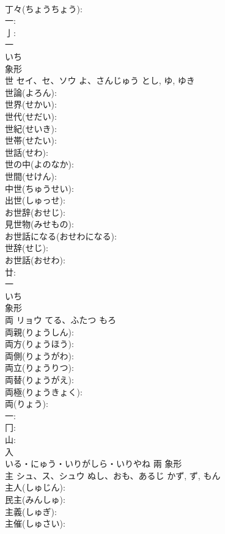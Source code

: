 \documentclass[8pt]{extreport}
\begin{document}
\begin{CJK}{UTF8}{min}
\\	丁々(ちょうちょう): 
\\	一: 
\\	亅: 
\\	一	
\\	いち	
\\	象形 
\\	世	セイ、セ、ソウ	よ、さんじゅう	とし, ゆ, ゆき	
\\	世論(よろん): 
\\	世界(せかい): 
\\	世代(せだい): 
\\	世紀(せいき): 
\\	世帯(せたい): 
\\	世話(せわ): 
\\	世の中(よのなか): 
\\	世間(せけん): 
\\	中世(ちゅうせい): 
\\	出世(しゅっせ): 
\\	お世辞(おせじ): 
\\	見世物(みせもの): 
\\	お世話になる(おせわになる): 
\\	世辞(せじ): 
\\	お世話(おせわ): 
\\	廿: 
\\	一	
\\	いち	
\\	象形 
\\	両	リョウ	てる、ふたつ	もろ	
\\	両親(りょうしん): 
\\	両方(りょうほう): 
\\	両側(りょうがわ): 
\\	両立(りょうりつ): 
\\	両替(りょうがえ): 
\\	両極(りょうきょく): 
\\	両(りょう): 
\\	一: 
\\	冂: 
\\	山: 
\\	入	
\\	いる・にゅう・いりがしら・いりやね	兩	象形 
\\	主	シュ、ス、シュウ	ぬし、おも、あるじ	かず, ず, もん	
\\	主人(しゅじん): 
\\	民主(みんしゅ): 
\\	主義(しゅぎ): 
\\	主催(しゅさい): 

\end{CJK}
\end{document}
